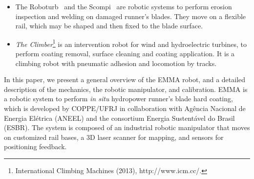 \begin{itemize}
\item The Roboturb~\cite{roboturb} and the Scompi~\cite{scompi} are robotic
systems to perform erosion inspection and welding on damaged runner's blades.
They move on a flexible rail, which may be shaped and then fixed to the blade
surface.

\item \textit{The Climber}\footnote{International Climbing Machines (2013),
http://www.icm.cc/.} %
 is an intervention robot for wind and hydroelectric turbines, to perform
coating removal, surface cleaning and coating application. It is a climbing
robot with pneumatic adhesion and locomotion by tracks.
\end{itemize}

In this paper, we present a general overview of the EMMA robot, and a detailed
description of the mechanics, the robotic manipulator, and calibration. EMMA is
a robotic system to perform \textit{in situ} hydropower runner's blade hard
coating, which is developed by COPPE/UFRJ in collaboration with Agência Nacional
de Energia Elétrica (ANEEL) and the consortium Energia Sustentável do Brasil
(ESBR). The system is composed of an industrial robotic manipulator that moves
on customized rail bases, a 3D laser scanner for mapping, and sensors for positioning
feedback. 
\begin{comment}
The system operate in a confined space, move
on a sloping and slippery environment through a rail, identify the runner's
blades, calibrate its position, generate the path planning and perform the hard
coating. 


This text is organized as follows: a general overview of the robot and its main
challenges are presented in Section \ref{sec:general_overview}, detailed
descriptions of the embedded electronics, the vehicle support system, power
supply system, and software architecture are taken in
Sections \ref{sec:electronics_overview}, \ref{sec:powersupply_overview}, and
\ref{sec:software} respectively.
In Section \ref{sec:results}, preliminary results are shown, and concluding
remarks are drawn in Section \ref{sec:conclusions}.
\end{comment}